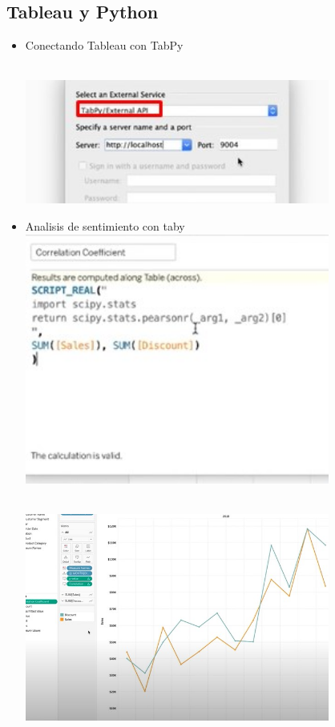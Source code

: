 \documentclass[preprint,12pt]{elsarticle}
\begin{document}
		\subsection{Tableau y Python}
			\begin{itemize}
				
				\item Conectando Tableau con TabPy
				
					\\	\includegraphics[width=10cm]{./IMAGENES/9.1}
				\item Analisis de sentimiento con taby
					\\	\includegraphics[width=10cm]{./IMAGENES/9.1.2}
					
				
					\\	\includegraphics[width=10cm]{./IMAGENES/9.2}
			\end{itemize}
	
\end{document}
